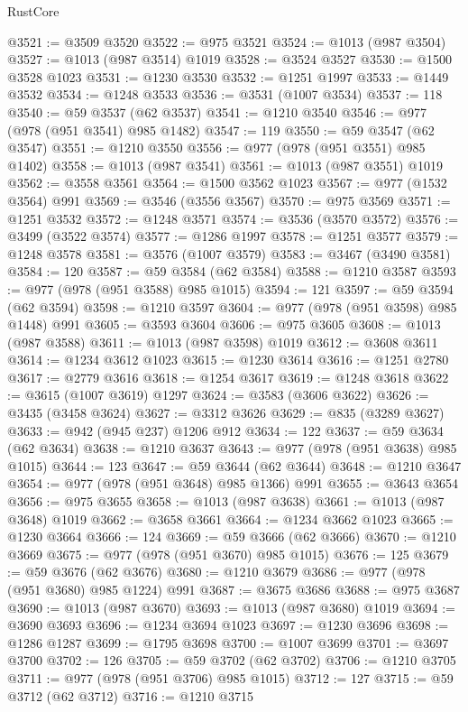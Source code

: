 \begin{lexlean}{RustCore}
\begin{coremodule}
@3521 := @3509 @3520
@3522 := @975 @3521
@3524 := @1013 (@987 @3504)
@3527 := @1013 (@987 @3514) @1019
@3528 := @3524 @3527
@3530 := @1500 @3528 @1023
@3531 := @1230 @3530
@3532 := @1251 @1997
@3533 := @1449 @3532
@3534 := @1248 @3533
@3536 := @3531 (@1007 @3534)
@3537 := 118
@3540 := @59 @3537 (@62 @3537)
@3541 := @1210 @3540
@3546 := @977 (@978 (@951 @3541) @985 @1482)
@3547 := 119
@3550 := @59 @3547 (@62 @3547)
@3551 := @1210 @3550
@3556 := @977 (@978 (@951 @3551) @985 @1402)
@3558 := @1013 (@987 @3541)
@3561 := @1013 (@987 @3551) @1019
@3562 := @3558 @3561
@3564 := @1500 @3562 @1023
@3567 := @977 (@1532 @3564) @991
@3569 := @3546 (@3556 @3567)
@3570 := @975 @3569
@3571 := @1251 @3532
@3572 := @1248 @3571
@3574 := @3536 (@3570 @3572)
@3576 := @3499 (@3522 @3574)
@3577 := @1286 @1997
@3578 := @1251 @3577
@3579 := @1248 @3578
@3581 := @3576 (@1007 @3579)
@3583 := @3467 (@3490 @3581)
@3584 := 120
@3587 := @59 @3584 (@62 @3584)
@3588 := @1210 @3587
@3593 := @977 (@978 (@951 @3588) @985 @1015)
@3594 := 121
@3597 := @59 @3594 (@62 @3594)
@3598 := @1210 @3597
@3604 := @977 (@978 (@951 @3598) @985 @1448) @991
@3605 := @3593 @3604
@3606 := @975 @3605
@3608 := @1013 (@987 @3588)
@3611 := @1013 (@987 @3598) @1019
@3612 := @3608 @3611
@3614 := @1234 @3612 @1023
@3615 := @1230 @3614
@3616 := @1251 @2780
@3617 := @2779 @3616
@3618 := @1254 @3617
@3619 := @1248 @3618
@3622 := @3615 (@1007 @3619) @1297
@3624 := @3583 (@3606 @3622)
@3626 := @3435 (@3458 @3624)
@3627 := @3312 @3626
@3629 := @835 (@3289 @3627)
@3633 := @942 (@945 @237) @1206 @912
@3634 := 122
@3637 := @59 @3634 (@62 @3634)
@3638 := @1210 @3637
@3643 := @977 (@978 (@951 @3638) @985 @1015)
@3644 := 123
@3647 := @59 @3644 (@62 @3644)
@3648 := @1210 @3647
@3654 := @977 (@978 (@951 @3648) @985 @1366) @991
@3655 := @3643 @3654
@3656 := @975 @3655
@3658 := @1013 (@987 @3638)
@3661 := @1013 (@987 @3648) @1019
@3662 := @3658 @3661
@3664 := @1234 @3662 @1023
@3665 := @1230 @3664
@3666 := 124
@3669 := @59 @3666 (@62 @3666)
@3670 := @1210 @3669
@3675 := @977 (@978 (@951 @3670) @985 @1015)
@3676 := 125
@3679 := @59 @3676 (@62 @3676)
@3680 := @1210 @3679
@3686 := @977 (@978 (@951 @3680) @985 @1224) @991
@3687 := @3675 @3686
@3688 := @975 @3687
@3690 := @1013 (@987 @3670)
@3693 := @1013 (@987 @3680) @1019
@3694 := @3690 @3693
@3696 := @1234 @3694 @1023
@3697 := @1230 @3696
@3698 := @1286 @1287
@3699 := @1795 @3698
@3700 := @1007 @3699
@3701 := @3697 @3700
@3702 := 126
@3705 := @59 @3702 (@62 @3702)
@3706 := @1210 @3705
@3711 := @977 (@978 (@951 @3706) @985 @1015)
@3712 := 127
@3715 := @59 @3712 (@62 @3712)
@3716 := @1210 @3715

\end{coremodule}
\end{lexlean}

